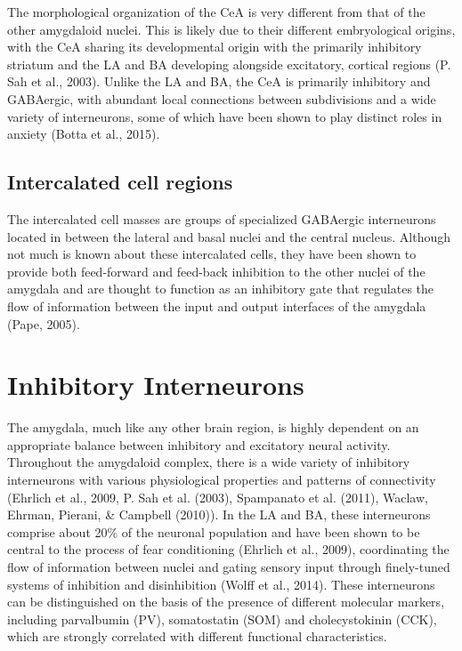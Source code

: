 \documentclass[12pt,a4paper,]{report}
\begin{document}
The morphological organization of the CeA is very different from that of
the other amygdaloid nuclei. This is likely due to their different
embryological origins, with the CeA sharing its developmental origin
with the primarily inhibitory striatum and the LA and BA developing
alongside excitatory, cortical regions (P. Sah et al., 2003). Unlike the
LA and BA, the CeA is primarily inhibitory and GABAergic, with abundant
local connections between subdivisions and a wide variety of
interneurons, some of which have been shown to play distinct roles in
anxiety (Botta et al., 2015).

\subsection{Intercalated cell regions}\label{intercalated-cell-regions}

The intercalated cell masses are groups of specialized GABAergic
interneurons located in between the lateral and basal nuclei and the
central nucleus. Although not much is known about these intercalated
cells, they have been shown to provide both feed-forward and feed-back
inhibition to the other nuclei of the amygdala and are thought to
function as an inhibitory gate that regulates the flow of information
between the input and output interfaces of the amygdala (Pape, 2005).

\section{Inhibitory Interneurons}\label{inhibitory-interneurons}

The amygdala, much like any other brain region, is highly dependent on
an appropriate balance between inhibitory and excitatory neural
activity. Throughout the amygdaloid complex, there is a wide variety of
inhibitory interneurons with various physiological properties and
patterns of connectivity (Ehrlich et al., 2009, P. Sah et al. (2003),
Spampanato et al. (2011), Waclaw, Ehrman, Pierani, \& Campbell (2010)).
In the LA and BA, these interneurons comprise about 20\% of the neuronal
population and have been shown to be central to the process of fear
conditioning (Ehrlich et al., 2009), coordinating the flow of
information between nuclei and gating sensory input through finely-tuned
systems of inhibition and disinhibition (Wolff et al., 2014). These
interneurons can be distinguished on the basis of the presence of
different molecular markers, including parvalbumin (PV), somatostatin
(SOM) and cholecystokinin (CCK), which are strongly correlated with
different functional characteristics.
\end{document}
